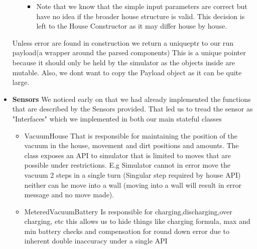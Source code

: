 \documentclass{article}
\begin{document}
\begin{itemize}
\begin{itemize}
\begin{itemize}
                        \item  Note that we know that the simple input parameters are correct but have no idea if the broader house structure is valid. This decision is left to the House Constructor as it may differ house by house.
                   \end{itemize}
       \end{itemize}
        Unless error are found in construction we return a uniqueptr to our run payload(a wrapper around the parsed components) This is a unique pointer because it should only be held by the simulator as the objects inside are mutable. Also, we dont want to copy the Payload object as it can be quite large.
        
    \item \textbf {Sensors} We noticed early on that we had already implemented the functions that are described by the Sensors provided. That led us to tread the sensor as "Interfaces" which we implemented in both our main stateful classes
    \begin{itemize}
        \item VacuumHouse That is responsible for maintaining the position of the vacuum in the house, movement and dirt positions and amounts. The class exposes an API to simulator that is limited to moves that are possible under restrictions. E.g Simulator cannot in error move the vacuum 2 steps in a single turn (Singular step required by house API) neither can he move into a wall (moving into a wall will result in error message and no move made).
        \item MeteredVacuumBattery Is responsible for charging,discharging,over charging, etc this allows us to hide things like charging formula, max and min battery checks and  compensation for round down error due to inherent double inaccuracy under a single API
    \end{itemize}


\end{itemize}
\end{document}
